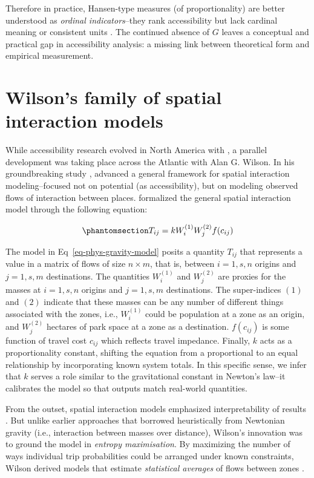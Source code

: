 \documentclass[
  10pt,
  letterpaper,
]{article}
\begin{document}
Therefore in practice, Hansen-type measures (of proportionality) are
better understood as \emph{ordinal indicators}--they rank accessibility
but lack cardinal meaning or consistent units
\citep{millerAccessibilityMeasurementApplication2018}. The continued
absence of \(G\) leaves a conceptual and practical gap in accessibility
analysis: a missing link between theoretical form and empirical
measurement.

\section{Wilson's family of spatial interaction
models}\label{wilsons-family-of-spatial-interaction-models}

While accessibility research evolved in North America with
\citet{hansen1959}, a parallel development was taking place across the
Atlantic with Alan G. Wilson. In his groundbreaking study
\citep{wilson1971}, advanced a general framework for spatial interaction
modeling--focused not on potential (as accessibility), but on modeling
observed flows of interaction between places. \citet{wilson1971}
formalized the general spatial interaction model through the following
equation:

\begin{equation}\phantomsection\label{eq-phys-gravity-model}{
T_{ij} = k W_i^{(1)} W_j^{(2)} f(c_{ij})
}\end{equation}

The model in Eq~\ref{eq-phys-gravity-model} posits a quantity \(T_{ij}\)
that represents a value in a matrix of flows of size \(n \times m\),
that is, between \(i = 1,s, n\) origins and \(j = 1,s, m\) destinations.
The quantities \(W_i^{(1)}\) and \(W_j^{(2)}\) are proxies for the
masses at \(i=1,s,n\) origins and \(j=1,s,m\) destinations. The
super-indices \((1)\) and \((2)\) indicate that these masses can be any
number of different things associated with the zones, i.e.,
\(W_i^{(1)}\) could be population at a zone as an origin, and
\(W_j^{(2)}\) hectares of park space at a zone as a destination.
\(f(c_{ij})\) is some function of travel cost \(c_{ij}\) which reflects
travel impedance. Finally, \(k\) acts as a proportionality constant,
shifting the equation from a proportional to an equal relationship by
incorporating known system totals. In this specific sense, we infer that
\(k\) serves a role similar to the gravitational constant in Newton's
law--it calibrates the model so that outputs match real-world
quantities.

From the outset, spatial interaction models emphasized interpretability
of results
\citep{kirbyNormalizingFactorsGravity1970, wilsonSTATISTICALTHEORYSPATIAL1967, wilson1971}.
But unlike earlier approaches that borrowed heuristically from Newtonian
gravity (i.e., interaction between masses over distance), Wilson's
innovation was to ground the model in \emph{entropy maximisation}. By
maximizing the number of ways individual trip probabilities could be
arranged under known constraints, Wilson derived models that estimate
\emph{statistical averages} of flows between zones
\citep{wilson1971, seniorGravityModellingEntropy1979}.
\end{document}
